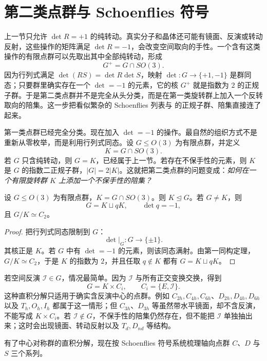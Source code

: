 \section{第二类点群与 Schoenflies 符号}
\label{sec:improper-point-groups}


上一节只允许 $\det R=+1$ 的纯转动。真实分子和晶体还可能有镜面、反演或转动反射，这些操作的矩阵满足 $\det R=-1$，会改变空间取向的手性。一个含有这类操作的有限点群可以先取出其中全部纯转动，形成
\[
G^+=G\cap SO(3).
\]
因为行列式满足 $\det(RS)=\det R\det S$，映射 $\det:G\to\{+1,-1\}$ 是群同态；只要群里确实存在一个 $\det=-1$ 的元素，它的核 $G^+$ 就是指数为 $2$ 的正规子群。于是第二类点群并不是完全从头分类，而是在第一类旋转群上加入一个反转取向的陪集。这一步把看似繁杂的 Schoenflies 列表与 的正规子群、陪集直接连了起来。

第一类点群已经完全分类。现在加入 $\det=-1$ 的操作。最自然的组织方式不是重新从零枚举，而是利用行列式同态。设 $G\leqslant O(3)$ 为有限点群，并定义
\[
K=G\cap SO(3).
\]
若 $G$ 只含纯转动，则 $G=K$，已经属于上一节。若存在不保手性的元素，则 $K$ 是 $G$ 的指数二正规子群，$|G|=2|K|$。这就把第二类点群的问题变成：\emph{如何在一个有限旋转群 $K$ 上添加一个不保手性的陪集？}

\begin{proposition}[点群的纯转动部分]
设 $G\leqslant O(3)$ 为有限点群，$K=G\cap SO(3)$。则 $K\mathrel{\trianglelefteq} G$。若 $G\neq K$，则
\[
G=K\sqcup qK,
\qquad \det q=-1,
\]
且 $G/K\simeq C_2$。
\label{prop:proper-subgroup-index-two}

\end{proposition}

\begin{proof}
把行列式同态限制到 $G$：
\[
\det|_G:G\to\{\pm1\}.
\]
其核正是 $K$。若 $G$ 中有 $\det=-1$ 的元素，则该同态满射。由第一同构定理，$G/K\simeq C_2$，于是 $K$ 的指数为 $2$，并且任取 $q\notin K$ 都有 $G=K\sqcup qK$。
\end{proof}

若空间反演 $\mathcal I\in G$，情况最简单。因为 $\mathcal I$ 与所有正交变换交换，得到
\[
G=K\times C_i,
\qquad C_i=\{E,\mathcal I\}.
\]
这种直积分解只适用于确实含反演中心的点群。例如 $C_{2h},C_{4h},C_{6h}$、$D_{2h},D_{4h},D_{6h}$ 以及 $T_h,O_h,I_h$ 都属于这一情形；但 $C_{3h}$、$D_{3h}$ 等虽然带水平镜面，却不含反演，不能写成 $K\times C_i$。若 $\mathcal I\notin G$，不保手性的陪集仍然存在，但不能把 $\mathcal I$ 单独抽出来；这时会出现镜面、转动反射以及 $T_d,D_{nd}$ 等结构。

有了中心对称群的直积分解，现在按 Schoenflies 符号系统梳理轴向点群 $C$、$D$ 与 $S$ 三个系列。

